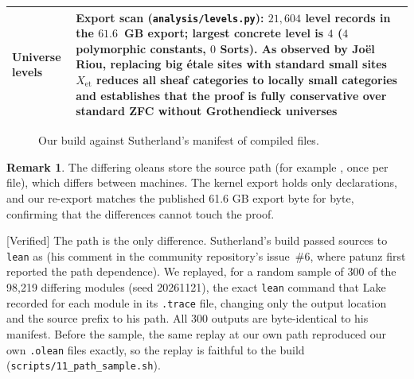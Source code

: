 \documentclass[11pt]{article}
\newcommand{\Verified}{\textcolor{verc}{\textsf{\small[Verified]}}}
\theoremstyle{plain}
\theoremstyle{definition}
\newtheorem{remark}[theorem]{Remark}
\begin{document}
\begin{center}
\begin{tabular}{@{}p{55mm}p{90mm}@{}}
Universe levels & Export scan (\texttt{analysis/levels.py}): $21{,}604$ level records in the $61.6$~GB export; largest concrete level is $4$ ($4$ polymorphic constants, $0$ Sorts). As observed by Jo\"el Riou, replacing big \'etale sites with standard small sites $X_\mathrm{et}$ reduces all sheaf categories to locally small categories and establishes that the proof is fully conservative over standard ZFC without Grothendieck universes\\
\bottomrule
\end{tabular}
\end{center}

\begin{figure}[ht]
\centering
{}
\caption{Our build against Sutherland's manifest of compiled files.}\label{fig:oleans}
\end{figure}

\begin{remark}
The differing oleans store the source path (for example
, once per file), which differs between machines.
The kernel export holds only declarations, and our re-export matches the published 61.6 GB export
byte for byte, confirming that the differences cannot touch the proof.
\end{remark}

\Verified{} The path is the only difference. Sutherland's build passed sources to \texttt{lean} as
 (his comment in the community repository's
issue~\#6, where patunz first reported the path dependence). We replayed, for a random sample of 300 of
the 98{,}219 differing modules (seed 20261121), the exact \texttt{lean} command that Lake recorded for
each module in its \texttt{.trace} file, changing only the output location and the source prefix to his
path. All 300 outputs are byte-identical to his manifest. Before the sample, the same replay at our own
path reproduced our own \texttt{.olean} files exactly, so the replay is faithful to the build
(\texttt{scripts/11\_path\_sample.sh}).
\end{document}
